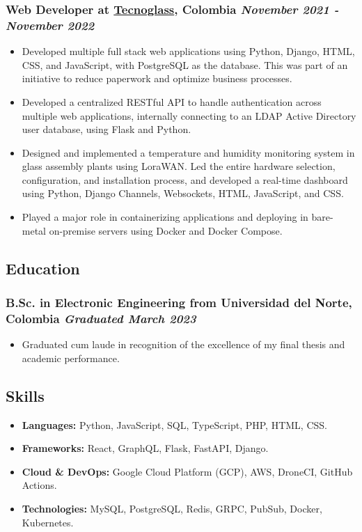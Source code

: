 \documentclass[a4paper,10pt]{article}
\begin{document}
\subsubsection*{%
  \textbf{Web Developer} at \href{https://www.tecnoglass.com/en/}{Tecnoglass}, Colombia
  \hfill
  \textit{November 2021 - November 2022}
}
\begin{itemize}
  \item Developed multiple full stack web applications using Python, Django, HTML, CSS, and JavaScript, with PostgreSQL as the database.
    This was part of an initiative to reduce paperwork and optimize business processes.
  \item Developed a centralized RESTful API to handle authentication across multiple web applications, internally connecting to an
    LDAP Active Directory user database, using Flask and Python.
  \item Designed and implemented a temperature and humidity monitoring system in glass assembly plants using LoraWAN.
    Led the entire hardware selection, configuration, and installation process, and developed a real-time
    dashboard using Python, Django Channels, Websockets, HTML, JavaScript, and CSS.
  \item Played a major role in containerizing applications and deploying in bare-metal on-premise servers using Docker and Docker Compose.
\end{itemize}

\subsection*{Education}
\subsubsection*{\textbf{B.Sc. in Electronic Engineering} from Universidad del Norte, Colombia \hfill \textit{Graduated March 2023}}
\begin{itemize}
  \item Graduated cum laude in recognition of the excellence of my final thesis and academic performance.
\end{itemize}

\subsection*{Skills}
\begin{itemize}
  \item \textbf{Languages:} Python, JavaScript, SQL, TypeScript, PHP, HTML, CSS.
  \item \textbf{Frameworks:} React, GraphQL, Flask, FastAPI, Django.
  \item \textbf{Cloud \& DevOps:} Google Cloud Platform (GCP), AWS, DroneCI, GitHub Actions.
  \item \textbf{Technologies:} MySQL, PostgreSQL, Redis, GRPC, PubSub, Docker, Kubernetes.
\end{itemize}

\end{document}
